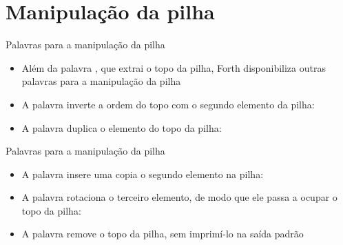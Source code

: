 \section{Manipulação da pilha}

\begin{frame}[fragile]{Palavras para a manipulação da pilha}

    \begin{itemize}
        \item Além da palavra , que extrai o topo da pilha, Forth disponibiliza
            outras palavras para a manipulação da pilha

        \item A palavra  inverte a ordem do topo com o segundo
            elemento da pilha:

            \vspace{0.1in}

        \item A palavra  duplica o elemento do topo da pilha:


    \end{itemize}

\end{frame}

\begin{frame}[fragile]{Palavras para a manipulação da pilha}

    \begin{itemize}
        \item A palavra  insere uma copia o segundo elemento na pilha:

            \vspace{0.1in}

        \item A palavra  rotaciona o terceiro elemento, de modo que
            ele passa a ocupar o topo da pilha:

            \vspace{0.1in}

        \item A palavra  remove o topo da pilha, sem imprimí-lo na saída
            padrão


    \end{itemize}

\end{frame}

